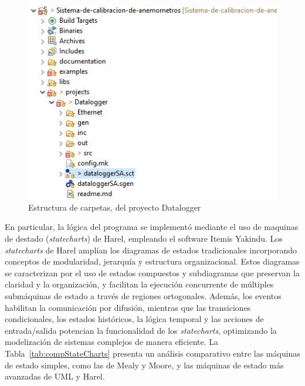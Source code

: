 \begin{figure}[H]
    \centering
    \includegraphics[width=0.40\linewidth]{Figuras/datalogger/Firmware/projectDataloggerFolder.jpg}
    \caption{Estructura de carpetas, del proyecto Datalogger}
    \label{fig:projectDataloggerFolder}
\end{figure}
En particular, la lógica del programa se implementó mediante el uso de maquinas de destado (\textit{statecharts}) de Harel, empleando el software Itemis Yakindu. Los \textit{statecharts} de Harel amplían los diagramas de estados tradicionales incorporando conceptos de modularidad, jerarquía y estructura organizacional. Estos diagramas se caracterizan por el uso de estados compuestos y subdiagramas que preservan la claridad y la organización, y facilitan la ejecución concurrente de múltiples submáquinas de estado a través de regiones ortogonales. Además, los eventos habilitan la comunicación por difusión, mientras que las transiciones condicionales, los estados históricos, la lógica temporal y las acciones de entrada/salida potencian la funcionalidad de los \textit{statecharts}, optimizando la modelización de sistemas complejos de manera eficiente. La Tabla~\ref{tab:compStateCharts} presenta un análisis comparativo entre las máquinas de estado simples, como las de Mealy y Moore, y las máquinas de estado más avanzadas de UML y Harel.


